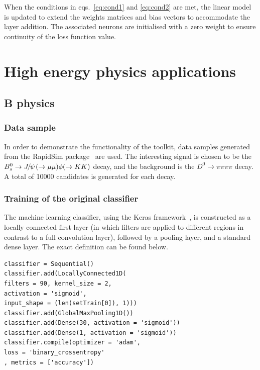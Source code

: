 \documentclass[final,5p,times,twocolumn]{elsarticle}
\def\Ppsi        {\ensuremath{\uppsi}\xspace}
\def\PB      {\ensuremath{\mathrm{B}}\xspace}
\def\PD      {\ensuremath{\mathrm{D}}\xspace}
\def\PJ      {\ensuremath{\mathrm{J}}\xspace}
\def\PK      {\ensuremath{\mathrm{K}}\xspace}
\def\Ps      {\ensuremath{\mathrm{s}}\xspace}
\def\Ppsi        {\ensuremath{\psi}\xspace}
\def\PB      {\ensuremath{B}\xspace}
\def\PD      {\ensuremath{D}\xspace}
\def\PJ      {\ensuremath{J}\xspace}
\def\PK      {\ensuremath{K}\xspace}
\def\Ps      {\ensuremath{s}\xspace}
\def\squark    {{\ensuremath{\Ps}}\xspace}
\def\D       {{\ensuremath{\PD}}\xspace}
\def\Dz      {{\ensuremath{\D^0}}\xspace}
\def\B       {{\ensuremath{\PB}}\xspace}
\def\Bs      {{\ensuremath{\B^0_\squark}}\xspace}
\def\jpsi     {{\ensuremath{{\PJ\mskip -3mu/\mskip -2mu\Ppsi\mskip 2mu}}}\xspace}
\def\to                 {\ensuremath{\rightarrow}\xspace}
\begin{document}
When the conditions in eqs.~\ref{eq:cond1} and \ref{eq:cond2} are met, the linear model
is updated to extend the weights matrices and bias vectors
to accommodate the layer addition.
The associated neurons are initialised with a zero weight
to ensure continuity of the loss function value.


\section{High energy physics applications}
\label{sec:hep}

\subsection{B physics}

\subsubsection{Data sample}

In order to demonstrate the functionality of the toolkit, data samples generated
from the RapidSim package~\cite{rapid} are used. The interesting signal is chosen
to be the $\Bs\to\jpsi(\to\mu\mu )\phi (\to\PK\PK )$ decay, and the background is
the $\Dz\to\pi\pi\pi\pi$ decay. A total of 10000 candidates is generated for each decay.

\subsubsection{Training of the original classifier}
\label{sec:orig_training}

The machine learning classifier, using the Keras framework~\cite{keras,adam},
is constructed as a locally connected first layer (in which filters are applied
to different regions in contrast to a full convolution layer), followed by a pooling layer,
and a standard dense layer. The exact definition can be found below.
\begin{lstlisting}
classifier = Sequential()
classifier.add(LocallyConnected1D(
filters = 90, kernel_size = 2,
activation = 'sigmoid',
input_shape = (len(setTrain[0]), 1)))
classifier.add(GlobalMaxPooling1D())
classifier.add(Dense(30, activation = 'sigmoid'))
classifier.add(Dense(1, activation = 'sigmoid'))
classifier.compile(optimizer = 'adam',
loss = 'binary_crossentropy'
, metrics = ['accuracy'])
\end{lstlisting}
\end{document}

